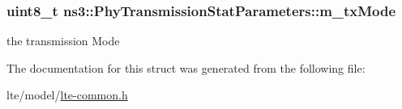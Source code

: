 \subsubsection[{\texorpdfstring{m\+\_\+tx\+Mode}{m_txMode}}]{\setlength{\rightskip}{0pt plus 5cm}uint8\+\_\+t ns3\+::\+Phy\+Transmission\+Stat\+Parameters\+::m\+\_\+tx\+Mode}\hypertarget{structns3_1_1PhyTransmissionStatParameters_a93bb8bd95e41a63fd0ff64411868478e}{}\label{structns3_1_1PhyTransmissionStatParameters_a93bb8bd95e41a63fd0ff64411868478e}


the transmission Mode 



The documentation for this struct was generated from the following file\+:\begin{DoxyCompactItemize}
\item 
lte/model/\hyperlink{lte-common_8h}{lte-\/common.\+h}\end{DoxyCompactItemize}
